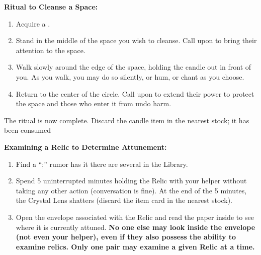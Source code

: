 \documentclass[green]{GL2020}
\begin{document}
\textbf{Ritual to Cleanse a Space:}
  \begin{enumerate}
    \item Acquire a \iRitualCandle{}.
    \item Stand in the middle of the space you wish to cleanse. Call upon \cFarmGod{} to bring their attention to the space.
    \item Walk slowly around the edge of the space, holding the candle out in front of you. As you walk, you may do so silently, or hum, or chant as you choose.
    \item Return to the center of the circle. Call upon \cTechGod{} to extend their power to protect the space and those who enter it from undo harm.
  \end{enumerate}
The ritual is now complete. Discard the candle item in the nearest stock; it has been consumed
   
\textbf{Examining a Relic to Determine Attunement:}
  \begin{enumerate}
    \item Find a ``\iCrystalLens{};'' rumor has it there are several in the Library. 
    \item Spend 5 uninterrupted minutes holding the Relic with your helper without taking any other action (conversation is fine). At the end of the 5 minutes, the Crystal Lens shatters (discard the item card in the nearest stock). 
    \item Open the envelope associated with the Relic and read the paper inside to see where it is currently attuned. \textbf{No one else may look inside the envelope (not even your helper), even if they also possess the ability to examine relics. Only one pair may examine a given Relic at a time.}
  \end{enumerate}
   
\end{document}
